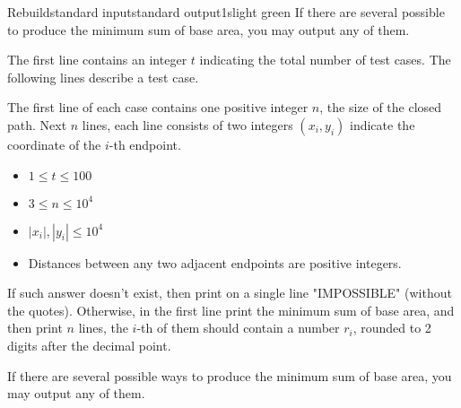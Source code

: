 \begin{problem}{Rebuild}{standard input}{standard output}{1s}{light green}
If there are several possible to produce the minimum sum of base area, you may output any of them.

\InputFile
The first line contains an integer $t$ indicating the total number of test cases.
The following lines describe a test case.

The first line of each case contains one positive integer $n$, the size of the closed path.
Next $n$ lines, each line consists of two integers $(x_i,y_i)$ indicate the coordinate of the $i$-th endpoint.
\begin{itemize}
\item $1 \le t \le 100$
\item $3 \le n \le 10^4$
\item $|x_i|,|y_i|\leq 10^4$
\item Distances between any two adjacent endpoints are positive integers.
\end{itemize}

\pagebreak
\OutputFile
If such answer doesn't exist, then print on a single line "IMPOSSIBLE" (without the quotes). 
Otherwise, in the first line print the minimum sum of base area, 
and then print $n$ lines, the $i$-th of them should contain a number $r_i$, 
rounded to 2 digits after the decimal point.

If there are several possible ways to produce the minimum sum of base area, you may output any of them.

\Example

\begin{example}
%
\end{example}
\end{problem}